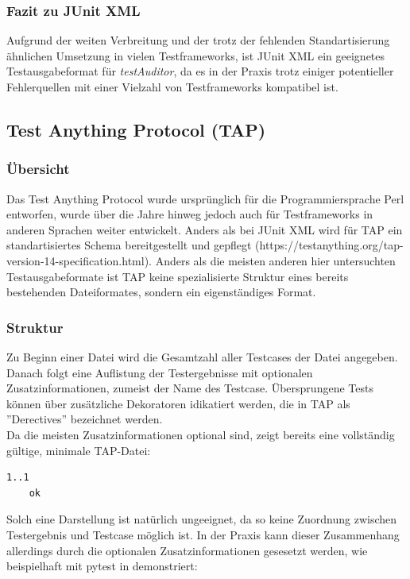 \subsubsection{Fazit zu JUnit XML}
Aufgrund der weiten Verbreitung und der trotz der fehlenden Standartisierung ähnlichen Umsetzung in vielen Testframeworks, ist JUnit XML ein geeignetes Testausgabeformat für \textit{testAuditor}, da es in der Praxis trotz einiger potentieller Fehlerquellen mit einer Vielzahl von Testframeworks kompatibel ist.

\subsection{Test Anything Protocol (TAP)}
\subsubsection{Übersicht}
Das Test Anything Protocol wurde ursprünglich für die Programmiersprache Perl entworfen, wurde über die Jahre hinweg jedoch auch für Testframeworks in anderen Sprachen weiter entwickelt. Anders als bei JUnit XML wird für TAP ein standartisiertes Schema bereitgestellt und gepflegt (https://testanything.org/tap-version-14-specification.html). Anders als die meisten anderen hier untersuchten Testausgabeformate ist TAP keine spezialisierte Struktur eines bereits bestehenden Dateiformates, sondern ein eigenständiges Format.

\subsubsection{Struktur}
Zu Beginn einer Datei wird die Gesamtzahl aller Testcases der Datei angegeben. Danach folgt eine Auflistung der Testergebnisse mit optionalen Zusatzinformationen, zumeist der Name des Testcase. Übersprungene Tests können über zusätzliche Dekoratoren idikatiert werden, die in TAP als ''Derectives'' bezeichnet werden.\\
Da die meisten Zusatzinformationen optional sind, zeigt  bereits eine vollständig gültige, minimale TAP-Datei:
\begin{lstlisting}[caption={Minimales TAP-Beispiel}, label={TAPmin}]
    1..1
    ok
\end{lstlisting}
Solch eine Darstellung ist natürlich ungeeignet, da so keine Zuordnung zwischen Testergebnis und Testcase möglich ist. In der Praxis kann dieser Zusammenhang allerdings durch die optionalen Zusatzinformationen gesesetzt werden, wie beispielhaft mit pytest in  demonstriert:

